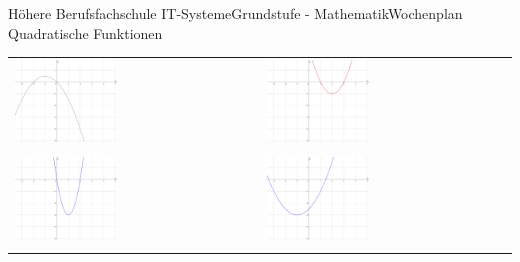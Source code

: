 \documentclass[oneside,openany,headings=optiontotoc,11pt,numbers=noenddot]{scrreprt}
\begin{document}
\begin{worksheet}{Höhere Berufsfachschule IT-Systeme}{Grundstufe - Mathematik}{Wochenplan Quadratische Funktionen}
\begin{framed}
\begin{tabularx}{\textwidth}{XX}
				\includegraphics[width=0.43\textwidth]{../99_Bilder/WP7FrD.png} & \includegraphics[width=0.43\textwidth]{../99_Bilder/WP7FrE.png}\\
				\\
				\includegraphics[width=0.43\textwidth]{../99_Bilder/WP7FrF.png} & \includegraphics[width=0.43\textwidth]{../99_Bilder/WP7FrB.png}\\
				\\

\end{tabularx}
\end{framed}
\end{worksheet}
\end{document}
